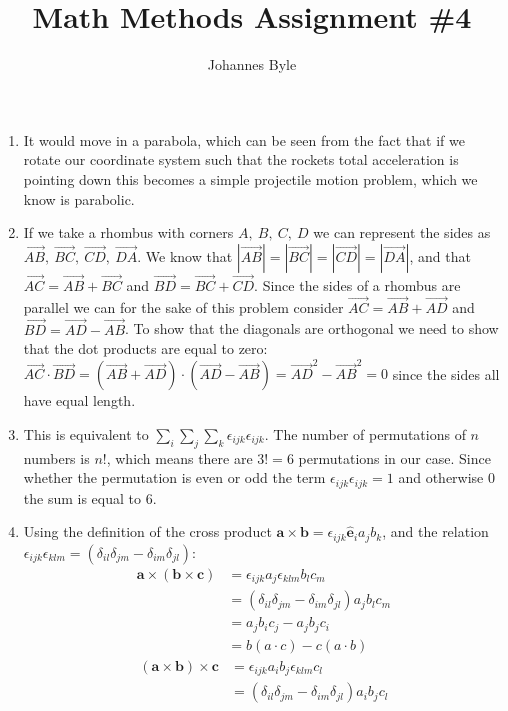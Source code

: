 \documentclass[12pt]{article}
\title{Math Methods Assignment \#4}
\author{Johannes Byle}
\begin{document}
  \maketitle
  \begin{enumerate}
    \item It would move in a parabola, which can be seen from the fact that if we rotate our coordinate system such that the rockets total acceleration is pointing down this becomes a simple projectile motion problem, which we know is parabolic.
    \item If we take a rhombus with corners $A,\ B,\ C,\ D$ we can represent the sides as $\vec{AB},\ \vec{BC},\ \vec{CD},\ \vec{DA}$.
    We know that $|\vec{AB}|=|\vec{BC}|=|\vec{CD}|=|\vec{DA}|$, and that $\vec{AC}=\vec{AB}+\vec{BC}$ and $\vec{BD}=\vec{BC}+\vec{CD}$.
    Since the sides of a rhombus are parallel we can for the sake of this problem consider $\vec{AC}=\vec{AB}+\vec{AD}$ and $\vec{BD}=\vec{AD}-\vec{AB}$.
    To show that the diagonals are orthogonal we need to show that the dot products are equal to zero: $\vec{AC}\cdot\vec{BD}=\left(\vec{AB}+\vec{AD}\right)\cdot\left(\vec{AD}-\vec{AB}\right)=\vec{AD}^2-\vec{AB}^2=0$ since the sides all have equal length.
    \item This is equivalent to $\sum_i\sum_j\sum_k \epsilon_{ijk}\epsilon_{ijk}$.
    The number of permutations of $n$ numbers is $n!$, which means there are $3!=6$ permutations in our case.
    Since whether the permutation is even or odd the term $\epsilon_{ijk}\epsilon_{ijk}=1$ and otherwise 0 the sum is equal to 6.
    \item Using the definition of the cross product $\pmb{a}\times\pmb{b}=\epsilon_{ijk}\pmb{\hat{e}}_i a_j b_k$, and the relation $\epsilon_{ijk}\epsilon_{klm}=(\delta_{il}\delta_{jm}-\delta_{im}\delta_{jl})$:
    \begin{align}
      \pmb{a}\times(\pmb{b}\times\pmb{c})& =\epsilon_{ijk}a_j\epsilon_{klm}b_l c_m\\
      & =(\delta_{il}\delta_{jm}-\delta_{im}\delta_{jl})a_j b_l c_m\\
      & =a_j b_i c_j-a_j b_j c_i\\
      & =b(a\cdot c)-c(a\cdot b)
    \end{align}
    \begin{align}
    (\pmb{a}\times\pmb{b})
      \times\pmb{c}& =\epsilon_{ijk}a_i b_j\epsilon_{klm}c_l\\
      & =(\delta_{il}\delta_{jm}-\delta_{im}\delta_{jl})a_i b_j c_l\\

\end{align}
\end{enumerate}
\end{document}
